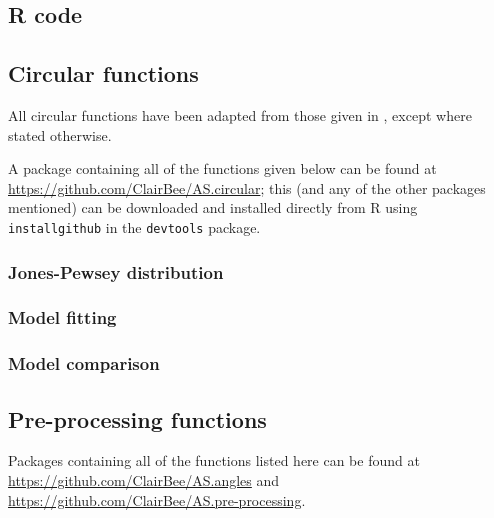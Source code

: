 \documentclass[12pt,fleqn]{article}
\numberwithin{equation}{section}
\begin{document}
%


\newpage


\newpage

%


\newpage


\newpage

\begin{appendix}
\section{R code}

\subsection{Circular functions}

All circular functions have been adapted from those given in \cite{Pewsey2014}, except where stated otherwise. 

A package containing all of the functions given below can be found at \url{https://github.com/ClairBee/AS.circular}; this (and any of the other packages mentioned) can be downloaded and installed directly from R using \texttt{install\textunderscore github} in the \texttt{devtools} package.

\subsubsection{Jones-Pewsey distribution}


\subsubsection{Model fitting}


\subsubsection{Model comparison}


\subsection{Pre-processing functions}
Packages containing all of the functions listed here can be found at \url{https://github.com/ClairBee/AS.angles} and \url{https://github.com/ClairBee/AS.pre-processing}.



\end{appendix}
\end{document}
